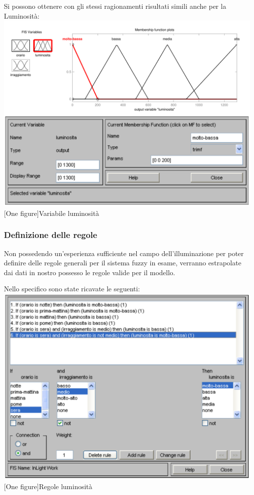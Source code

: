Si possono ottenere con gli stessi ragionamenti risultati simili anche per la Luminosità:\\

\vspace{20px}
\includegraphics[scale=0.5]{images/fuzzy/variabile_luminosita.pdf}
[One figure]{Variabile luminosità}
\vspace{20px}

\subsubsection{Definizione delle regole}
Non possedendo un'esperienza sufficiente nel campo dell'illuminazione per poter definire delle regole generali per il sistema fuzzy in esame, verranno estrapolate dai dati in nostro possesso le regole valide per il modello.

Nello specifico sono state ricavate le seguenti:\\

\vspace{20px}
\includegraphics[scale=0.5]{images/fuzzy/regole_luminosita.pdf}
[One figure]{Regole luminosità}
\vspace{20px}

